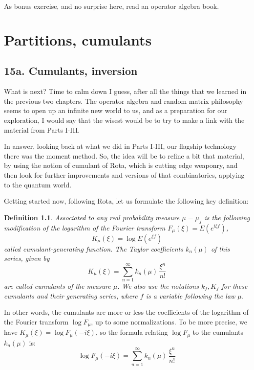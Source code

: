 \documentclass[12pt]{amsbook}
\newtheorem{definition}[theorem]{Definition}
\begin{document}
As bonus exercise, and no surprise here, read an operator algebra book.

\chapter{Partitions, cumulants}

\section*{15a. Cumulants, inversion}

What is next? Time to calm down I guess, after all the things that we learned in the previous two chapters. The operator algebra and random matrix philosophy seems to open up an infinite new world to us, and as a preparation for our exploration, I would say that the wisest would be to try to make a link with the material from Parts I-III.

\bigskip

In answer, looking back at what we did in Parts I-III, our flagship technology there was the moment method. So, the idea will be to refine a bit that material, by using the notion of cumulant of Rota, which is cutting edge weaponry, and then look for further improvements and versions of that combinatorics, applying to the quantum world.

\bigskip

Getting started now, following Rota, let us formulate the following key definition:


\begin{definition}
Associated to any real probability measure $\mu=\mu_f$ is the following modification of the logarithm of the Fourier transform $F_\mu(\xi)=E(e^{i\xi f})$,
$$K_\mu(\xi)=\log E(e^{\xi f})$$
called cumulant-generating function. The Taylor coefficients $k_n(\mu)$ of this series, given by
$$K_\mu(\xi)=\sum_{n=1}^\infty k_n(\mu)\,\frac{\xi^n}{n!}$$
are called cumulants of the measure $\mu$. We also use the notations $k_f,K_f$ for these cumulants and their generating series, where $f$ is a variable following the law $\mu$.
\end{definition}

In other words, the cumulants are more or less the coefficients of the logarithm of the Fourier transform $\log F_\mu$, up to some normalizations. To be more precise, we have $K_\mu(\xi)=\log F_\mu(-i\xi)$, so the formula relating $\log F_\mu$ to the cumulants $k_n(\mu)$ is:
$$\log F_\mu(-i\xi)=\sum_{n=1}^\infty k_n(\mu)\,\frac{\xi^n}{n!}$$
\end{document}
